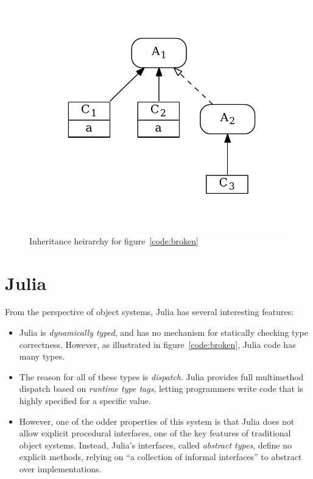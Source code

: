 \documentclass[preprint]{sigplanconf}
\begin{document}
\begin{figure}
\centering
\includegraphics[scale=.6]{example2.pdf}
\caption{Inheritance heirarchy for figure~\ref{code:broken}}
\label{fig:algo}
\end{figure}

\section{Julia}

From the perspective of object systems, Julia has several interesting features:
\begin{itemize}
\item Julia is \emph{dynamically typed}, and has no mechanism for statically
checking type correctness. However, as illustrated in figure~\ref{code:broken},
Julia code has many types.
\item The reason for all of these types is \emph{dispatch}. Julia provides 
full multimethod dispatch based on \emph{runtime type tags}, letting programmers
write code that is highly specified for a specific value.
\item However, one of the odder properties of this system is that Julia does not
allow explicit procedural interfaces, one of the key features of traditional 
object systems. Instead, Julia's interfaces, called \emph{abstract types}, 
define no explicit methods, relying on ``a collection of informal interfaces''
\cite{juliadocu} to abstract over implementations.
\end{itemize}
\end{document}
